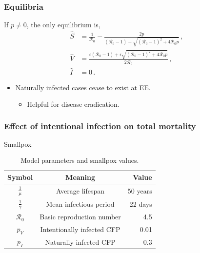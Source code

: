 \documentclass[12pt]{beamer}
\newcommand{\R}{\mathcal{R}}
\newcommand{\pmV}{p_{V}}
\newcommand{\pmI}{p_{I}}
\begin{document}
\begin{frame}
\frametitle{Equilibria}

If $p\neq 0$, the only equilibrium is,
\begin{subequations}
\begin{align}
\hat{S}&= \frac{1}{\R_0}-\frac{2p}{(\R_0 -1)+ \sqrt{(\R_0-1)^2+4\R_0
         p}}\,, \label{eq:Shat}\\
\hat{V}&= \frac{\epsilon(\R_0 -1)+ \epsilon \sqrt{(\R_0-1)^2+4\R_0 p}}{2\R_0}\,, \label{eq:Vhat}\\
\hat{I}&=0\,. \label{eq:Ihat}
\end{align}
\end{subequations}

\begin{itemize}
\item Naturally infected cases cease to exist at EE.
\begin{itemize}
\item Helpful for disease eradication.
\end{itemize}
\end{itemize}
\end{frame}
\begin{frame}
\frametitle{Effect of intentional infection on total mortality}
\begin{center}
Smallpox
\end{center}
\begin{table}[H]\label{tab:params}
\begin{center}
\caption{Model parameters and smallpox values.}
\smallskip
\begin{tabular}{c|c|r}
{\bfseries Symbol} & {\bfseries Meaning} & {\bfseries Value} \\\hline
$\frac{1}{\mu}$ & Average lifespan & 50 years \\
$\frac{1}{\gamma}$ & Mean infectious period & 22 days \\
$\R_0$ & Basic reproduction number & 4.5\\
$\pmV$ & Intentionally infected CFP & 0.01\\
$\pmI$ & Naturally infected CFP & 0.3
\end{tabular}
\end{center}
\end{table}
\end{frame}
\end{document}
